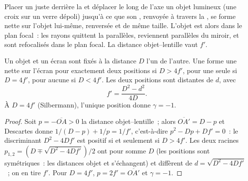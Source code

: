 \begin{method}[Autocollimation]\label{met:b1:mirrors-thin-lenses:autocollimation}
Placer un  juste derrière la  et déplacer le long de
l'axe un objet lumineux (une croix sur un verre dépoli) jusqu'à ce que
son , renvoyée à travers la , se forme nette sur l'objet
lui-même, renversée et de même taille. L'objet est alors dans le plan
focal~: les rayons quittent la  parallèles, reviennent
parallèles du miroir, et sont refocalisés dans le plan focal. La
distance objet--lentille vaut $f'$.
\end{method}

\begin{proposition}\label{prop:b1:mirrors-thin-lenses:bessel}
Un objet et un écran sont fixés à la distance $D$ l'un de l'autre. Une
 forme une  nette sur l'écran pour
exactement deux positions si $D > 4f'$, pour une seule si $D = 4f'$,
pour aucune si $D < 4f'$. Les deux positions sont distantes de $d$, avec
\[
f' = \frac{D^2 - d^2}{4D} .
\]
À $D = 4f'$ (Silbermann), l'unique position donne $\gamma = -1$.
\end{proposition}

\begin{proof}
Soit $p = -\overline{OA} > 0$ la distance objet--lentille~; alors
$\overline{OA'} = D - p$ et Descartes donne $1/(D - p) + 1/p = 1/f'$,
c'est-à-dire $p^2 - Dp + Df' = 0$~: le discriminant $D^2 - 4Df'$ est
positif si et seulement si $D > 4f'$. Les deux racines
$p_{1,2} = (D \mp \sqrt{D^2 - 4Df'})/2$ ont pour somme $D$ (les positions
sont symétriques~: les distances objet et  s'échangent) et
diffèrent de $d = \sqrt{D^2 - 4Df'}$~; on en tire $f'$. Pour
$D = 4f'$, $p = 2f' = \overline{OA'}$ et $\gamma = -1$.
\end{proof}

